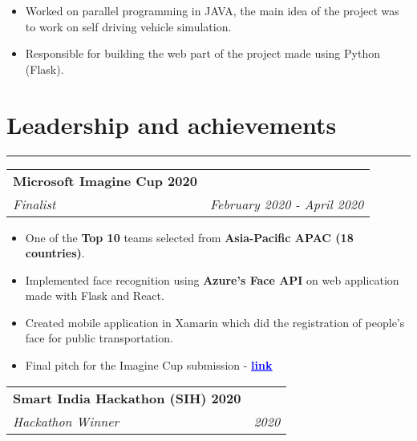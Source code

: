 \documentclass[a4paper,6pt]{article}
\begin{document}
\small
\begin{itemize}
	\itemsep0em
	\item Worked on parallel programming in JAVA, the main idea of the project was to work on self driving vehicle simulation.
	\item Responsible for building the web part of the project made using Python (Flask).
\end{itemize}



\vspace{-9px}
\section*{Leadership and achievements}
\vspace{-8px}
\hrule

\vspace{5px}
\begin{tabularx}{\textwidth}{X r}
	\large{\textbf{Microsoft Imagine Cup 2020}} \vspace{2px} & \\
	\textit{\small Finalist}& \textit{February 2020 - April 2020} \\
\end{tabularx}
\small
\begin{itemize}
	\itemsep0em
	\item One of the \textcolor{mygray}{\textbf{Top 10}} teams selected from \textcolor{mygray}{\textbf{Asia-Pacific APAC (18 countries)}}.
	\item Implemented face recognition using \textcolor{mygray}{\textbf{Azure’s Face API}} on web application made with Flask and React.
	\item Created mobile application in Xamarin which did the registration of people's face for public transportation.
	\item Final pitch for the Imagine Cup submission - \href{https://www.youtube.com/watch?v=RiNJscdLECA}{\textcolor{blue}{\textbf{\underline{link}}}}
\end{itemize}

\vspace{4px}
\begin{tabularx}{\textwidth}{X r}
	\large{\textbf{Smart India Hackathon (SIH) 2020}} \vspace{1px} & \\
	\textit{\small Hackathon Winner}& \textit{2020} \\
\end{tabularx}
\end{document}
